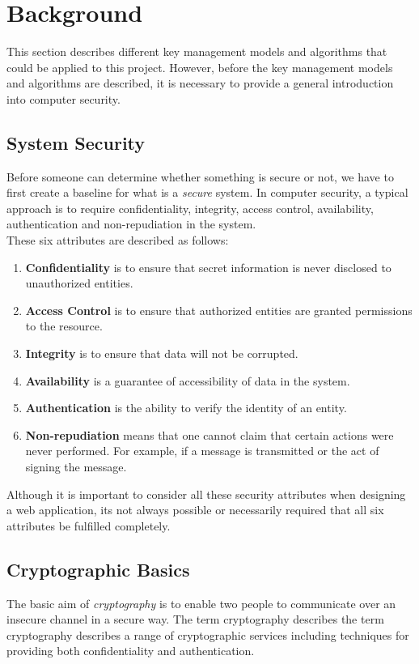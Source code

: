 \documentclass[11pt, a4paper, notitlepage]{article}
\begin{document}
\makeblankpage


\section{Background}
This section describes different key management models and algorithms that could be applied to this project. However, before the key management models and algorithms are described, it is necessary to provide a general introduction into computer security. 

\subsection*{System Security}
Before someone can determine whether something is secure or not, we have to first create a baseline for what is a \emph{secure} system. In computer security, a typical approach is to require confidentiality, integrity, access control, availability, authentication and non-repudiation in the system\cite{Pfleeger:2006:SC:1177321}. \\

These six attributes are described as follows:

\begin{enumerate}
\item \textbf{Confidentiality} is to ensure that secret information is never disclosed to unauthorized entities.
\item \textbf{Access Control} is to ensure that authorized entities are granted permissions to the resource.
\item \textbf{Integrity} is to ensure that data will not be corrupted.
\item \textbf{Availability} is a guarantee of accessibility of data in the system.
\item \textbf{Authentication} is the ability to verify the identity of an entity.
\item \textbf{Non-repudiation} means that one cannot claim that certain actions were never performed. For example, if a message is transmitted or the act of signing the message.
\end{enumerate}

Although it is important to consider all these security attributes when designing a web application, its not always possible or necessarily required that all six attributes be fulfilled completely. 

\subsection*{Cryptographic Basics}
The basic aim of \emph{cryptography} is to enable two people to communicate over an insecure channel in a secure way. The term cryptography describes the term cryptography describes a range of cryptographic services including techniques for providing both confidentiality and authentication. 
\end{document}
